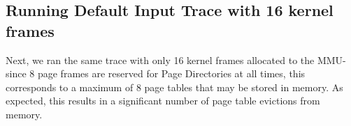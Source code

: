 \documentclass[12pt,a4paper,english]{paper}
\newenvironment{colorboxed}[4][gray]{
\begin{tcolorbox}[colback=#1!3!white,colframe=#1(ryb)!50!black,title=\textbf{#2: #3},#4]
}{
\end{tcolorbox}
}
\begin{document}
\begin{colorboxed}{Output}{256 Kernel Frames}{unbreakable}
    \inputminted[baselinestretch=0.85,breaklines]{text}{output256.txt}
\end{colorboxed}

\subsection{Running Default Input Trace with 16 kernel frames}
Next, we ran the same trace with only 16 kernel frames allocated to the MMU- since 8 page frames are reserved for Page Directories at all times, this corresponds to a maximum of 8 page tables that may be stored in memory. As expected, this results in a significant number of page table evictions from memory.\\

\begin{colorboxed}{Output}{16 Kernel Frames}{unbreakable}
    \inputminted[baselinestretch=0.85,breaklines]{text}{output16.txt}
\end{colorboxed}





\end{document}
